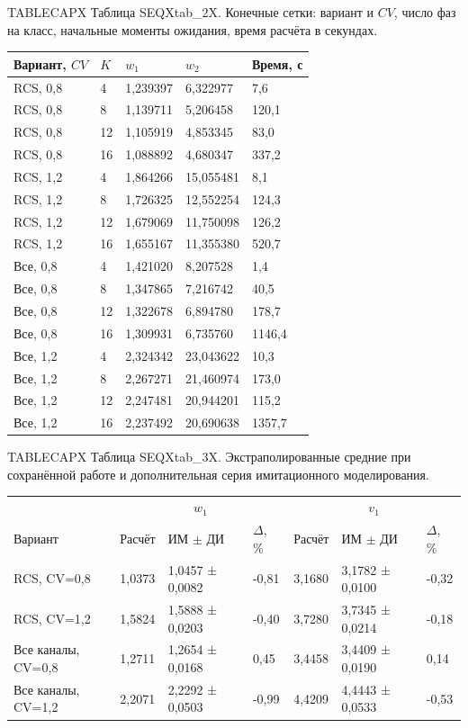 \noindent TABLECAPX Таблица SEQXtab_2X. Конечные сетки: вариант и \(CV\), число фаз на класс, начальные моменты ожидания, время расчёта в секундах.\par

\setlength{\tabcolsep}{2pt}
\begin{tabular}{p{4.44cm}p{1.13cm}p{3.31cm}p{3.31cm}p{2.46cm}}
\toprule
Вариант, $CV$ & $K$ & $w_1$ & $w_2$ & Время, с \\
\midrule
RCS, 0,8 & 4 & 1,239397 & 6,322977 & 7,6 \\
RCS, 0,8 & 8 & 1,139711 & 5,206458 & 120,1 \\
RCS, 0,8 & 12 & 1,105919 & 4,853345 & 83,0 \\
RCS, 0,8 & 16 & 1,088892 & 4,680347 & 337,2 \\
RCS, 1,2 & 4 & 1,864266 & 15,055481 & 8,1 \\
RCS, 1,2 & 8 & 1,726325 & 12,552254 & 124,3 \\
RCS, 1,2 & 12 & 1,679069 & 11,750098 & 126,2 \\
RCS, 1,2 & 16 & 1,655167 & 11,355380 & 520,7 \\
Все, 0,8 & 4 & 1,421020 & 8,207528 & 1,4 \\
Все, 0,8 & 8 & 1,347865 & 7,216742 & 40,5 \\
Все, 0,8 & 12 & 1,322678 & 6,894780 & 178,7 \\
Все, 0,8 & 16 & 1,309931 & 6,735760 & 1146,4 \\
Все, 1,2 & 4 & 2,324342 & 23,043622 & 10,3 \\
Все, 1,2 & 8 & 2,267271 & 21,460974 & 173,0 \\
Все, 1,2 & 12 & 2,247481 & 20,944201 & 115,2 \\
Все, 1,2 & 16 & 2,237492 & 20,690638 & 1357,7 \\
\bottomrule
\end{tabular}




\noindent TABLECAPX Таблица SEQXtab_3X. Экстраполированные средние при сохранённой работе и дополнительная серия имитационного моделирования.\par

\setlength{\tabcolsep}{2pt}
\begin{tabular}{p{4.16cm}p{1.61cm}p{2.83cm}p{1.28cm}p{1.61cm}p{2.83cm}p{1.28cm}}
\toprule
 & \multicolumn{3}{c}{$w_1$} & \multicolumn{3}{c}{$v_1$} \\
Вариант & Расчёт & ИМ $\pm$ ДИ & $\Delta$, \% & Расчёт & ИМ $\pm$ ДИ & $\Delta$, \% \\
\midrule
RCS, CV=0,8 & 1,0373 & 1,0457 ± 0,0082 & -0,81 & 3,1680 & 3,1782 ± 0,0100 & -0,32 \\
RCS, CV=1,2 & 1,5824 & 1,5888 ± 0,0203 & -0,40 & 3,7280 & 3,7345 ± 0,0214 & -0,18 \\
Все каналы, CV=0,8 & 1,2711 & 1,2654 ± 0,0168 & 0,45 & 3,4458 & 3,4409 ± 0,0190 & 0,14 \\
Все каналы, CV=1,2 & 2,2071 & 2,2292 ± 0,0503 & -0,99 & 4,4209 & 4,4443 ± 0,0533 & -0,53 \\
\bottomrule
\end{tabular}




